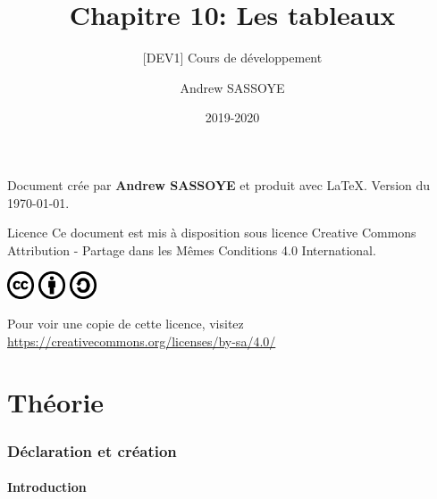 \documentclass{beamer}
\title{Chapitre 10: Les tableaux}
\subtitle{\tiny [DEV1] Cours de développement}
\author{Andrew SASSOYE}
\date{2019-2020}
\begin{document}
	\begin{frame}
		\titlepage
	\end{frame}

	\begin{frame}
        \center Document crée par \textbf{Andrew SASSOYE} et produit avec \LaTeX.
        \tiny Version du \today. \normalsize

		\begin{block}{Licence}
            Ce document est mis à disposition sous licence Creative Commons
            Attribution - Partage dans les Mêmes Conditions 4.0 International.

            \begin{center}
                \includegraphics[width=8mm]{./styles/images/cc}
                \includegraphics[width=8mm]{./styles/images/by}
                \includegraphics[width=8mm]{./styles/images/sa}
            \end{center}

            \center\tiny Pour voir une copie de cette licence, visitez
            \href{https://creativecommons.org/licenses/by-sa/4.0/}{https://creativecommons.org/licenses/by-sa/4.0/}
            \normalsize
        \end{block}


    \end{frame}

    \part{Théorie}

    \section{Déclaration et création}\label{sec:declaration-et-creation}
        \subsection{Introduction}\label{subsec:introduction}
            
\end{document}
